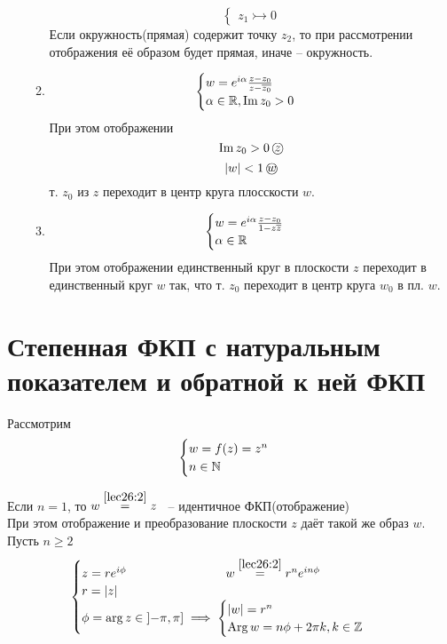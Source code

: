 \documentclass[../../main.tex]{subfiles}
\begin{document}
\begin{examples}
\begin{enumerate}
\begin{enumerate}
\[\begin{cases}
  z_1 \rightarrowtail 0   
 \end{cases}
 \]
Если окружность(прямая) содержит точку $z_2$, то при рассмотрении отображения
её образом будет прямая, иначе -- окружность.
 \item
\[
\begin{cases}
 w = e^{i\alpha} \frac{z - z_0}{z- \overline{z_0}} \\
 \alpha \in \mathbb{R},  \operatorname{Im} z_0 > 0
\end{cases}     
\]
При этом отображении 
\[
\operatorname{Im} z_0 > 0\,  \text{\textcircled{$z$}}
\]
\[
|w| < 1\,  \text{\textcircled{$w$}}
\]
т. $z_0$ из \textcircled{$z$} переходит в центр круга плосскости
\textcircled{$w$}.

 \item
\[
 \begin{cases}
  w = e^{i\alpha} \frac{z - z_0}{1 - z \overline{z}} \\
  \alpha \in \mathbb{R}
 \end{cases}
\]
При этом отображении единственный круг в плоскости \textcircled{$z$}
переходит в единственный круг \textcircled{$w$} так, что т. $z_0$ переходит
в центр круга  $w_0$ в пл. \textcircled{$w$}.


\end{enumerate}

\end{enumerate}
\end{examples}

\section{Степенная ФКП с натуральным показателем и обратной к ней ФКП}
Рассмотрим
\begin{equation}
\label{lec26:2}
\begin{cases}
 w = f(z) = z^n \\
 n \in \mathbb{N}
\end{cases}
\end{equation}

Если $n = 1$, то $w \stackrel{\eqref{lec26:2}}{=} z$ ~-- 
идентичное ФКП(отображение) \\
При этом отображение и преобразование плоскости \textcircled{$z$} 
даёт такой же образ \textcircled{$w$}. \\
Пусть $n \geq 2$
\[
\begin{cases}
 z =re^{i\phi} \qquad\qquad\qquad\qquad 
 w\stackrel{\eqref{lec26:2}}{=} r^ne^{in\phi}\\
 r = |z| \\
 \phi = \operatorname{arg} z \in \left] -\pi, \pi \right] \implies 
 \begin{cases}
 |w| = r^{n} \\
 \operatorname{\operatorname{Arg}}w = n \phi + 2\pi k, k \in \mathbb{Z}
 \end{cases}
\end{cases}
\]
\end{document}
